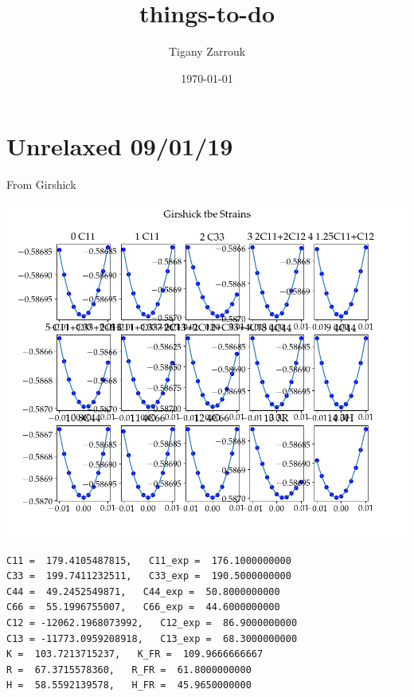 \documentclass[11pt]{article}
\author{Tigany Zarrouk}
\date{\today}
\title{things-to-do}
\begin{document}
\maketitle
\tableofcontents

\section{Unrelaxed 09/01/19}
\label{sec:org43dac11}
From Girshick 
\begin{center}
\includegraphics[width=.9\linewidth]{Images/girshick_ec_09-01-19.png}
\end{center}
\begin{verbatim}
C11 =  179.4105487815,   C11_exp =  176.1000000000
C33 =  199.7411232511,   C33_exp =  190.5000000000
C44 =  49.2452549871,   C44_exp =  50.8000000000
C66 =  55.1996755007,   C66_exp =  44.6000000000
C12 = -12062.1968073992,   C12_exp =  86.9000000000
C13 = -11773.0959208918,   C13_exp =  68.3000000000
K =  103.7213715237,   K_FR =  109.9666666667
R =  67.3715578360,   R_FR =  61.8000000000
H =  58.5592139578,   H_FR =  45.9650000000 

\end{verbatim}
\end{document}
